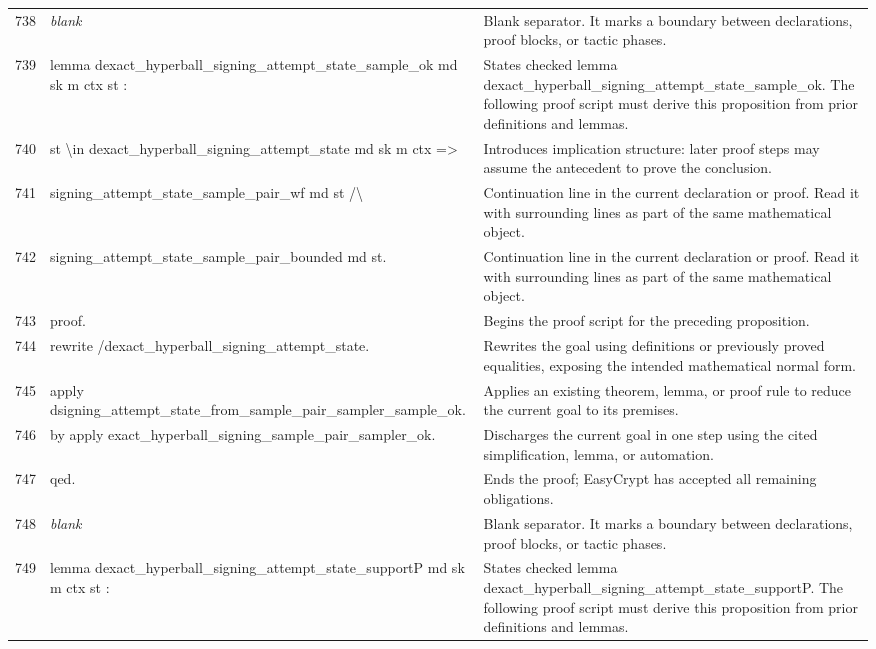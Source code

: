\documentclass[10pt]{article}
\begin{document}
\begin{longtable}{r L{0.53\textwidth} L{0.37\textwidth}}
738 & {\ttfamily\scriptsize \emph{blank}} & Blank separator.  It marks a boundary between declarations, proof blocks, or tactic phases. \\
739 & {\ttfamily\scriptsize lemma dexact\_hyperball\_signing\_attempt\_state\_sample\_ok md sk m ctx st :} & States checked lemma dexact\_hyperball\_signing\_attempt\_state\_sample\_ok.  The following proof script must derive this proposition from prior definitions and lemmas. \\
740 & {\ttfamily\scriptsize   st \textbackslash{}in dexact\_hyperball\_signing\_attempt\_state md sk m ctx =>} & Introduces implication structure: later proof steps may assume the antecedent to prove the conclusion. \\
741 & {\ttfamily\scriptsize   signing\_attempt\_state\_sample\_pair\_wf md st /\textbackslash{}} & Continuation line in the current declaration or proof.  Read it with surrounding lines as part of the same mathematical object. \\
742 & {\ttfamily\scriptsize   signing\_attempt\_state\_sample\_pair\_bounded md st.} & Continuation line in the current declaration or proof.  Read it with surrounding lines as part of the same mathematical object. \\
743 & {\ttfamily\scriptsize proof.} & Begins the proof script for the preceding proposition. \\
744 & {\ttfamily\scriptsize rewrite /dexact\_hyperball\_signing\_attempt\_state.} & Rewrites the goal using definitions or previously proved equalities, exposing the intended mathematical normal form. \\
745 & {\ttfamily\scriptsize apply dsigning\_attempt\_state\_from\_sample\_pair\_sampler\_sample\_ok.} & Applies an existing theorem, lemma, or proof rule to reduce the current goal to its premises. \\
746 & {\ttfamily\scriptsize by apply exact\_hyperball\_signing\_sample\_pair\_sampler\_ok.} & Discharges the current goal in one step using the cited simplification, lemma, or automation. \\
747 & {\ttfamily\scriptsize qed.} & Ends the proof; EasyCrypt has accepted all remaining obligations. \\
748 & {\ttfamily\scriptsize \emph{blank}} & Blank separator.  It marks a boundary between declarations, proof blocks, or tactic phases. \\
749 & {\ttfamily\scriptsize lemma dexact\_hyperball\_signing\_attempt\_state\_supportP md sk m ctx st :} & States checked lemma dexact\_hyperball\_signing\_attempt\_state\_supportP.  The following proof script must derive this proposition from prior definitions and lemmas. \\

\end{longtable}
\end{document}
